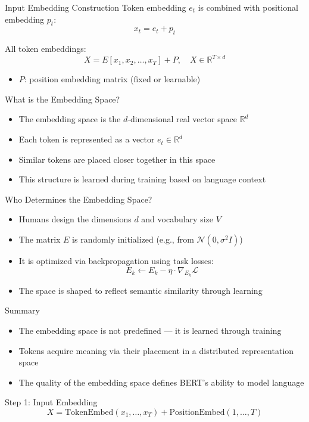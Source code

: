 \documentclass{beamer}
\begin{document}
	\begin{frame}{Input Embedding Construction}
		Token embedding $e_t$ is combined with positional embedding $p_t$:
		\[
		x_t = e_t + p_t
		\]
		
		All token embeddings:
		\[
		X = E[x_1, x_2, \dots, x_T] + P, \quad X \in \mathbb{R}^{T \times d}
		\]
		\begin{itemize}
			\item $P$: position embedding matrix (fixed or learnable)
		\end{itemize}
	\end{frame}
	
	\begin{frame}{What is the Embedding Space?}
		\begin{itemize}
			\item The embedding space is the $d$-dimensional real vector space $\mathbb{R}^d$
			\item Each token is represented as a vector $e_t \in \mathbb{R}^d$
			\item Similar tokens are placed closer together in this space
			\item This structure is learned during training based on language context
		\end{itemize}
	\end{frame}
	
	\begin{frame}{Who Determines the Embedding Space?}
		\begin{itemize}
			\item Humans design the dimensions $d$ and vocabulary size $V$
			\item The matrix $E$ is randomly initialized (e.g., from $\mathcal{N}(0, \sigma^2 I)$)
			\item It is optimized via backpropagation using task losses:
			\[
			E_k \leftarrow E_k - \eta \cdot \nabla_{E_k} \mathcal{L}
			\]
			\item The space is shaped to reflect semantic similarity through learning
		\end{itemize}
	\end{frame}
	
	\begin{frame}{Summary}
		\begin{itemize}
			\item The embedding space is not predefined — it is learned through training
			\item Tokens acquire meaning via their placement in a distributed representation space
			\item The quality of the embedding space defines BERT's ability to model language
		\end{itemize}
	\end{frame}
	\begin{frame}{Step 1: Input Embedding}
		\[
		X = \text{TokenEmbed}(x_1, \dots, x_T) + \text{PositionEmbed}(1, \dots, T)
		\]
	\end{frame}
	
\end{document}
